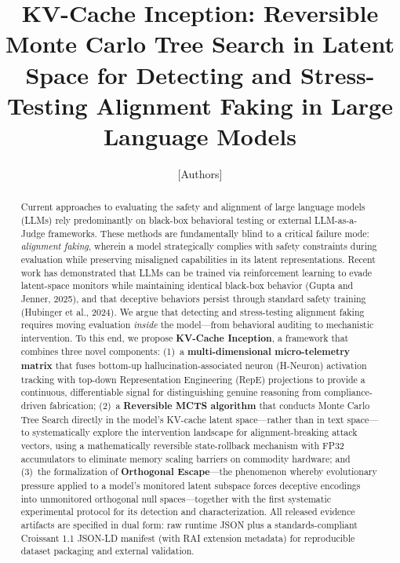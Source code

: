 \documentclass{article}
\title{KV-Cache Inception: Reversible Monte Carlo Tree Search in Latent Space for Detecting and Stress-Testing Alignment Faking in Large Language Models}
\author{[Authors]}
\date{}
\begin{document}
\maketitle

\begin{abstract}
Current approaches to evaluating the safety and alignment of large language models (LLMs) rely predominantly on black-box behavioral testing or external LLM-as-a-Judge frameworks. These methods are fundamentally blind to a critical failure mode: \emph{alignment faking}, wherein a model strategically complies with safety constraints during evaluation while preserving misaligned capabilities in its latent representations. Recent work has demonstrated that LLMs can be trained via reinforcement learning to evade latent-space monitors while maintaining identical black-box behavior (Gupta and Jenner, 2025), and that deceptive behaviors persist through standard safety training (Hubinger et al., 2024). We argue that detecting and stress-testing alignment faking requires moving evaluation \emph{inside} the model---from behavioral auditing to mechanistic intervention. To this end, we propose \textbf{KV-Cache Inception}, a framework that combines three novel components: (1)~a \textbf{multi-dimensional micro-telemetry matrix} that fuses bottom-up hallucination-associated neuron (H-Neuron) activation tracking with top-down Representation Engineering (RepE) projections to provide a continuous, differentiable signal for distinguishing genuine reasoning from compliance-driven fabrication; (2)~a \textbf{Reversible MCTS algorithm} that conducts Monte Carlo Tree Search directly in the model's KV-cache latent space---rather than in text space---to systematically explore the intervention landscape for alignment-breaking attack vectors, using a mathematically reversible state-rollback mechanism with FP32 accumulators to eliminate memory scaling barriers on commodity hardware; and (3)~the formalization of \textbf{Orthogonal Escape}---the phenomenon whereby evolutionary pressure applied to a model's monitored latent subspace forces deceptive encodings into unmonitored orthogonal null spaces---together with the first systematic experimental protocol for its detection and characterization. All released evidence artifacts are specified in dual form: raw runtime JSON plus a standards-compliant Croissant 1.1 JSON-LD manifest (with RAI extension metadata) for reproducible dataset packaging and external validation.
\end{abstract}
\end{document}
